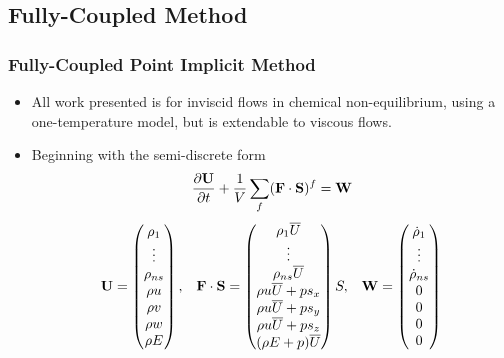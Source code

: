 \documentclass{beamer}
\begin{document}
\subsection{Fully-Coupled Method}
\begin{frame}
  \frametitle{Fully-Coupled Point Implicit Method}
  \begin{itemize}
    \item All work presented is for inviscid flows in chemical non-equilibrium,
      using a one-temperature model, but is extendable to viscous flows.
    \item Beginning with the semi-discrete form
    \begin{equation*}
    	\label{inv_flux_fv}
    	\frac{\partial \mathbf U}{\partial t}
    	 + \frac{1}{V}\sum\limits_{f}(\mathbf F\cdot\mathbf S)^f = \mathbf W
    \end{equation*}
    \begin{equation*}
    	\begin{matrix}
    	\mathbf U=\begin{pmatrix}
       		\rho_1\\
    		\vdots \\
    		\rho_{ns} \\
    		\rho u \\
    		\rho v \\
    		\rho w \\
    		\rho E \\
    	\end{pmatrix},      &
     	\mathbf{F \cdot S} = \begin{pmatrix}
    		\rho_1  \overline{U} \\
    		\vdots \\
    		\rho_{ns} \overline{U} \\
    		\rho u \overline{U} + p s_x\\
    		\rho u \overline{U} + p s_y\\
    		\rho u \overline{U} + p s_z\\
    		(\rho E + p) \overline{U} \\
    	\end{pmatrix}S,    &
     	\mathbf W = \begin{pmatrix}
        \dot\rho_1\\
    		\vdots \\
    		\dot\rho_{ns} \\
        0 \\
        0 \\
        0 \\
        0
      \end{pmatrix}

  	\end{matrix}
  \end{equation*}

  \end{itemize}
\end{frame}
\end{document}
